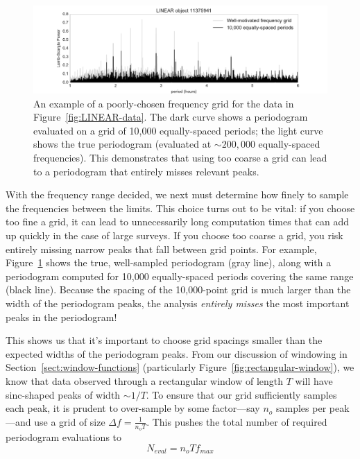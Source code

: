 \documentclass[preprint]{aastex}
\newcommand{\fig}[1]{Figure~\ref{fig:#1}}
\newcommand{\figlabel}[1]{\label{fig:#1}}
\newcommand{\eqlabel}[1]{\label{eq:#1}}
\newcommand{\Sect}[1]{Section~\ref{sect:#1}}
\newcommand{\sect}[1]{\Sect{#1}}
\begin{document}
\begin{figure}[ht]
  \centering
  \includegraphics[width=\textwidth]{fig19_LINEAR_coarse_grid}
  \caption{An example of a poorly-chosen frequency grid for the data in
    \fig{LINEAR-data}. The dark curve shows a periodogram evaluated on a
    grid of 10,000 equally-spaced periods; the light curve shows the true
    periodogram (evaluated at ${\sim}200,000$ equally-spaced frequencies).
    This demonstrates that using too coarse a grid can lead to a periodogram
    that entirely misses relevant peaks.
    \figlabel{LINEAR-coarse-grid}}
\end{figure}

With the frequency range decided, we next must determine how finely to sample
the frequencies between the limits.
This choice turns out to be vital: if you choose too fine a grid, it can
lead to unnecessarily long computation times that can add up quickly in the
case of large surveys. If you choose too coarse a grid, you
risk entirely missing narrow peaks that fall between grid points.
For example, \fig{LINEAR-coarse-grid} shows the true, well-sampled periodogram
(gray line), along with a periodogram computed for 10,000 equally-spaced
periods covering the same range (black line).
Because the spacing of the 10,000-point grid is much larger than the width of
the periodogram peaks, the analysis {\it entirely misses} the most
important peaks in the periodogram!

This shows us that it's important to choose grid spacings smaller than the
expected widths of the periodogram peaks.
From our discussion of windowing in \sect{window-functions}
(particularly \fig{rectangular-window}), we know that data observed through a
rectangular window of length $T$ will have sinc-shaped peaks of width
${\sim}1/T$.
To ensure that our grid sufficiently samples each peak, it is prudent to
over-sample by some factor---say $n_o$ samples per peak---and
use a grid of size $\Delta f = \frac{1}{n_o T}$.
This pushes the total number of required periodogram evaluations to
\begin{equation}
  \eqlabel{n-eval}
  N_{eval} = n_o T f_{max}
\end{equation}
\end{document}
